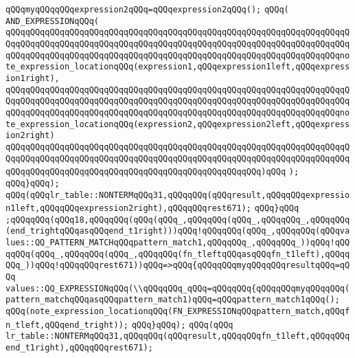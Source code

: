 \verb|qQQqmyqQQqqQQqexpression2qQQq=qQQqexpression2qQQq();|\newline
\verb|qQQq(|\newline
\verb|AND_EXPRESSIONqQQq(|\newline
\verb|qQQqqQQqqQQqqQQqqQQqqQQqqQQqqQQqqQQqqQQqqQQqqQQqqQQqqQQqqQQqqQQqqQQqqQQqqQQqqQQqqQQqqQQqqQQqqQQqqQQqqQQqqQQqqQQqqQQqqQQqqQQqqQQqqQQqqQQqqQQqqQQqqQQqqQQqqQQqqQQqqQQqqQQqqQQqqQQqqQQqqQQqqQQqqQQqqQQqqQQqqQQqqQQqnote_expression_locationqQQq(expression1,qQQqexpression1left,qQQqexpression1right),|\newline
\verb|qQQqqQQqqQQqqQQqqQQqqQQqqQQqqQQqqQQqqQQqqQQqqQQqqQQqqQQqqQQqqQQqqQQqqQQqqQQqqQQqqQQqqQQqqQQqqQQqqQQqqQQqqQQqqQQqqQQqqQQqqQQqqQQqqQQqqQQqqQQqqQQqqQQqqQQqqQQqqQQqqQQqqQQqqQQqqQQqqQQqqQQqqQQqqQQqqQQqqQQqqQQqqQQqnote_expression_locationqQQq(expression2,qQQqexpression2left,qQQqexpression2right)|\newline
\verb|qQQqqQQqqQQqqQQqqQQqqQQqqQQqqQQqqQQqqQQqqQQqqQQqqQQqqQQqqQQqqQQqqQQqqQQqqQQqqQQqqQQqqQQqqQQqqQQqqQQqqQQqqQQqqQQqqQQqqQQqqQQqqQQqqQQqqQQqqQQqqQQqqQQqqQQqqQQqqQQqqQQqqQQqqQQqqQQqqQQqqQQqqQQqqQQq)qQQq|\newline
\verb|);|\newline
\verb|qQQq}qQQq);|\newline
\verb|qQQq(qQQqlr_table::NONTERMqQQq31,qQQqqQQq(qQQqresult,qQQqqQQqexpression1left,qQQqqQQqexpression2right),qQQqqQQqrest671);|\newline
\verb|qQQq}qQQq|\newline
\verb|;qQQqqQQq(qQQq18,qQQqqQQq(qQQq(qQQq_,qQQqqQQq(qQQq_,qQQqqQQq_,qQQqqQQq(end_trightqQQqasqQQqend_t1right)))qQQq!qQQqqQQq(qQQq_,qQQqqQQq(qQQqvalues::QQ_PATTERN_MATCHqQQqpattern_match1,qQQqqQQq_,qQQqqQQq_))qQQq!qQQqqQQq(qQQq_,qQQqqQQq(qQQq_,qQQqqQQq(fn_tleftqQQqasqQQqfn_t1left),qQQqqQQq_))qQQq!qQQqqQQqrest671))qQQq=>qQQq{qQQqqQQqmyqQQqqQQqresultqQQq=qQQq|\newline
\verb|values::QQ_EXPRESSIONqQQq(\\qQQqqQQq_qQQq=qQQqqQQq{qQQqqQQqmyqQQqqQQq(pattern_matchqQQqasqQQqpattern_match1)qQQq=qQQqpattern_match1qQQq();|\newline
\verb|qQQq(note_expression_locationqQQq(FN_EXPRESSIONqQQqpattern_match,qQQqfn_tleft,qQQqend_tright));|\newline
\verb|qQQq}qQQq);|\newline
\verb|qQQq(qQQq|\newline
\verb|lr_table::NONTERMqQQq31,qQQqqQQq(qQQqresult,qQQqqQQqfn_t1left,qQQqqQQqend_t1right),qQQqqQQqrest671);|\newline

